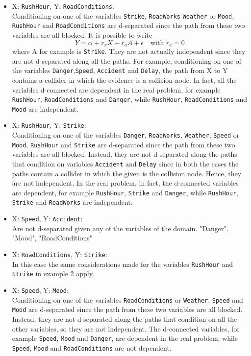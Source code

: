\documentclass[a4paper,12pt]{article} %
\begin{document}
\begin{itemize}
	\item X: \texttt{RushHour}, Y: \texttt{RoadConditions}:\\	
	Conditioning on one of the variables \texttt{Strike}, \texttt{RoadWorks} \texttt{Weather} or \texttt{Mood}, \texttt{RushHour} and \texttt{RoadConditions} are d-separated since the path from these two variables are all blocked.
	It is possible to write 
	\[ Y = \alpha + r_x X + r_a A + \epsilon \quad \text{with } r_a=0\]
	where A for example is \texttt{Strike}. 
	They are not actually independent since they are not d-separated along all the paths. For example, conditioning on one of the variables \texttt{Danger},\texttt{Speed}, \texttt{Accident} and \texttt{Delay}, the path from X to Y contains a collider in which the evidence is a collision node.
	In fact, all the variables d-connected are dependent in the real problem, for example \texttt{RushHour}, \texttt{RoadConditions} and \texttt{Danger}, while \texttt{RushHour}, \texttt{RoadConditions} and \texttt{Mood} are independent.
	
	\item X: \texttt{RushHour}, Y: \texttt{Strike}:\\
	Conditioning on one of the variables \texttt{Danger}, \texttt{RoadWorks}, \texttt{Weather}, \texttt{Speed} or \texttt{Mood}, \texttt{RushHour} and \texttt{Strike} are d-separated since the path from these two variables are all blocked.
	Instead, they are not d-separated along the paths that condition on variables \texttt{Accident} and \texttt{Delay} since in both the cases the paths contain a collider in which the given is the collision node. Hence, they are not independent.
	In the real problem, in fact, the d-connected variables are dependent, for example \texttt{RushHour}, \texttt{Strike} and \texttt{Danger}, while \texttt{RushHour}, \texttt{Strike} and \texttt{RoadWorks} are independent.
	
	\item X: \texttt{Speed}, Y: \texttt{Accident}:\\
	Are not d-separated given any of the variables of the domain.
	"Danger", "Mood", "RoadConditions"
	
	\item X: \texttt{RoadConditions}, Y: \texttt{Strike}:\\
	In this case the same considerations made for the variables \texttt{RushHour} and \texttt{Strike} in example 2 apply.
	
	\item X: \texttt{Speed}, Y: \texttt{Mood}:\\
	Conditioning on one of the variables \texttt{RoadConditions} or \texttt{Weather}, \texttt{Speed} and \texttt{Mood} are d-separated since the path from these two variables are all blocked.
	Instead, they are not d-separated along the paths that condition on all the other variables, so they are not independent.
	The d-connected variables, for example \texttt{Speed}, \texttt{Mood} and \texttt{Danger}, are dependent in the real problem, while \texttt{Speed}, \texttt{Mood} and \texttt{RoadConditions} are not dependent.

\end{itemize}
\end{document}

